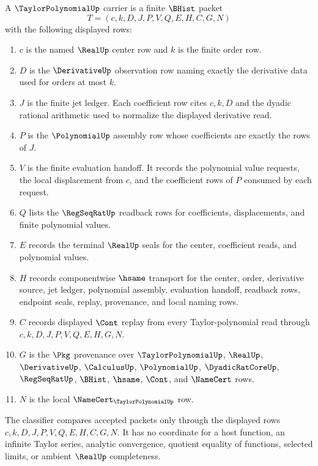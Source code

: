 \begin{definition}
\label{def:taylor-polynomial-carrier}
A $\TaylorPolynomialUp$ carrier is a finite $\BHist$ packet
$$
T=(c,k,D,J,P,V,Q,E,H,C,G,N)
$$
with the following displayed rows:
\begin{enumerate}
\item $c$ is the named $\RealUp$ center row and $k$ is the finite order row.
\item $D$ is the $\DerivativeUp$ observation row naming exactly the derivative data used for orders at most $k$.
\item $J$ is the finite jet ledger. Each coefficient row cites $c,k,D$ and the dyadic rational arithmetic used to normalize the displayed derivative read.
\item $P$ is the $\PolynomialUp$ assembly row whose coefficients are exactly the rows of $J$.
\item $V$ is the finite evaluation handoff. It records the polynomial value requests, the local displacement from $c$, and the coefficient rows of $P$ consumed by each request.
\item $Q$ lists the $\RegSeqRatUp$ readback rows for coefficients, displacements, and finite polynomial values.
\item $E$ records the terminal $\RealUp$ seals for the center, coefficient reads, and polynomial values.
\item $H$ records componentwise $\hsame$ transport for the center, order, derivative source, jet ledger, polynomial assembly, evaluation handoff, readback rows, endpoint seals, replay, provenance, and local naming rows.
\item $C$ records displayed $\Cont$ replay from every Taylor-polynomial read through $c,k,D,J,P,V,Q,E,H,G,N$.
\item $G$ is the $\Pkg$ provenance over $\TaylorPolynomialUp$, $\RealUp$, $\DerivativeUp$, $\CalculusUp$, $\PolynomialUp$, $\DyadicRatCoreUp$, $\RegSeqRatUp$, $\BHist$, $\hsame$, $\Cont$, and $\NameCert$ rows.
\item $N$ is the local $\NameCert_{\TaylorPolynomialUp}$ row.
\end{enumerate}
The classifier compares accepted packets only through the displayed rows $c,k,D,J,P,V,Q,E,H,C,G,N$. It has no coordinate for a host function, an infinite Taylor series, analytic convergence, quotient equality of functions, selected limits, or ambient $\RealUp$ completeness.
\end{definition}

